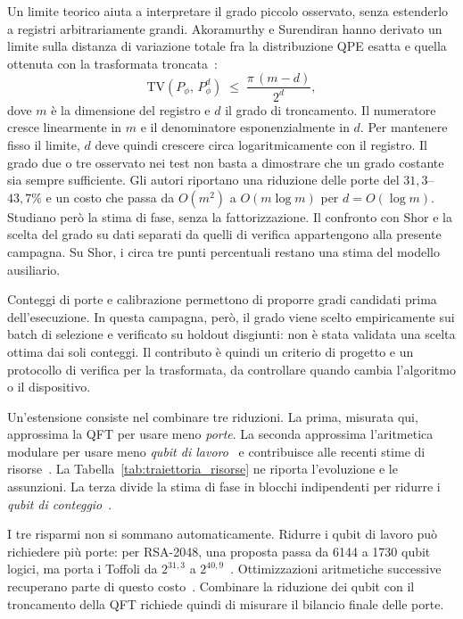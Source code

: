 \begin{onehalfspace}
Un limite teorico aiuta a interpretare il grado piccolo osservato, senza estenderlo a registri arbitrariamente grandi. Akoramurthy e Surendiran hanno derivato un limite sulla distanza di variazione totale fra la distribuzione QPE esatta e quella ottenuta con la trasformata troncata~\cite{akoramurthy2026}:
%
\begin{equation}
\mathrm{TV}\!\left(P_\phi,\, P_\phi^{d}\right) \;\le\; \frac{\pi\,(m-d)}{2^{d}},
\label{eq:bound_troncamento}
\end{equation}
%
dove $m$ è la dimensione del registro e $d$ il grado di troncamento. Il numeratore cresce linearmente in $m$ e il denominatore esponenzialmente in $d$. Per mantenere fisso il limite, $d$ deve quindi crescere circa logaritmicamente con il registro. Il grado due o tre osservato nei test non basta a dimostrare che un grado costante sia sempre sufficiente. Gli autori riportano una riduzione delle porte del $31{,}3$--$43{,}7\%$ e un costo che passa da $O(m^2)$ a $O(m \log m)$ per $d = O(\log m)$. Studiano però la stima di fase, senza la fattorizzazione. Il confronto con Shor e la scelta del grado su dati separati da quelli di verifica appartengono alla presente campagna. Su Shor, i circa tre punti percentuali restano una stima del modello ausiliario.

Conteggi di porte e calibrazione permettono di proporre gradi candidati
prima dell'esecuzione. In questa campagna, però, il grado viene scelto
empiricamente sui batch di selezione e verificato su holdout disgiunti:
non è stata validata una scelta ottima dai soli conteggi. Il contributo
è quindi un criterio di progetto e un protocollo di verifica per la
trasformata, da controllare quando cambia l'algoritmo o il dispositivo.

Un'estensione consiste nel combinare tre riduzioni. La prima, misurata qui, approssima la QFT per usare meno \emph{porte}. La seconda approssima l'aritmetica modulare per usare meno \emph{qubit di lavoro}~\cite{chevignard2025} e contribuisce alle recenti stime di risorse~\cite{gidney2025}. La Tabella~\ref{tab:traiettoria_risorse} ne riporta l'evoluzione e le assunzioni. La terza divide la stima di fase in blocchi indipendenti per ridurre i \emph{qubit di conteggio}~\cite{shukla2026}.

I tre risparmi non si sommano automaticamente. Ridurre i qubit di lavoro può richiedere più porte: per RSA-2048, una proposta passa da 6144 a 1730 qubit logici, ma porta i Toffoli da $2^{31{,}3}$ a $2^{40{,}9}$~\cite{chevignard2025}. Ottimizzazioni aritmetiche successive recuperano parte di questo costo~\cite{gidney2025}. Combinare la riduzione dei qubit con il troncamento della QFT richiede quindi di misurare il bilancio finale delle porte.


\end{onehalfspace}
